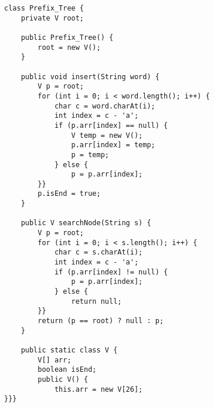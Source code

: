 \begin{verbatim}
class Prefix_Tree {
	private V root;

	public Prefix_Tree() {
		root = new V();
	}

	public void insert(String word) {
		V p = root;
		for (int i = 0; i < word.length(); i++) {
			char c = word.charAt(i);
			int index = c - 'a';
			if (p.arr[index] == null) {
				V temp = new V();
				p.arr[index] = temp;
				p = temp;
			} else {
				p = p.arr[index];
		}}
		p.isEnd = true;
	}

	public V searchNode(String s) {
		V p = root;
		for (int i = 0; i < s.length(); i++) {
			char c = s.charAt(i);
			int index = c - 'a';
			if (p.arr[index] != null) {
				p = p.arr[index];
			} else {
				return null;
		}}
		return (p == root) ? null : p;
	}

	public static class V {
		V[] arr;
		boolean isEnd;
		public V() {
			this.arr = new V[26];
}}}
\end{verbatim}
